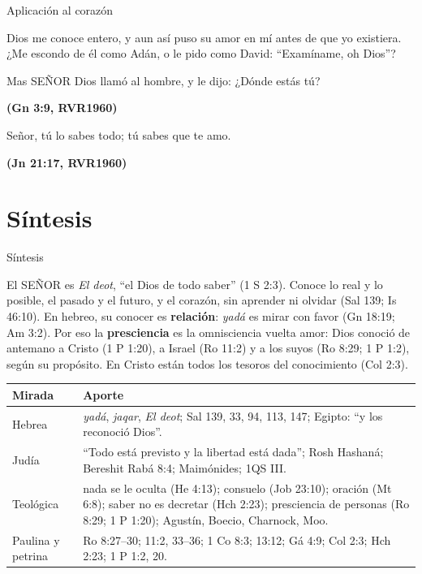 \documentclass[hyperref={bookmarks=false},aspectratio=169]{beamer}
\newcommand{\SENOR}{S{\fontsize{0.78em}{1em}\selectfont EÑOR}}
\newcommand{\fuente}[1]{\par\hfill{\upshape\bfseries\footnotesize\textcolor{azul}{#1}}}
\newcommand{\destacar}[1]{\textbf{\textcolor{azul}{#1}}}
\begin{document}
\begin{frame}{Aplicación al corazón}
\begin{tcolorbox}[colback=papiro,colframe=dorado,boxrule=1.4pt,arc=3pt]
\centering\large Dios me conoce entero, y aun así puso su amor en mí antes de que yo existiera. ¿Me escondo de él como Adán, o le pido como David: ``Examíname, oh Dios''?
\end{tcolorbox}\par\medskip
\begin{cita}Mas \SENOR{} Dios llamó al hombre, y le dijo: ¿Dónde estás tú?\fuente{(Gn 3:9, RVR1960)}\end{cita}
\begin{cita}Señor, tú lo sabes todo; tú sabes que te amo.\fuente{(Jn 21:17, RVR1960)}\end{cita}
\end{frame}

\section{Síntesis}

\begin{frame}{Síntesis}
\begin{tcolorbox}[colback=papiro,colframe=azul,boxrule=1pt,arc=3pt]
\small El \SENOR{} es \emph{El deot}, ``el Dios de todo saber'' (1 S 2:3). Conoce lo real y lo posible, el pasado y el futuro, y el corazón, sin aprender ni olvidar (Sal 139; Is 46:10). En hebreo, su conocer es \destacar{relación}: \emph{yadá} es mirar con favor (Gn 18:19; Am 3:2). Por eso la \destacar{presciencia} es la omnisciencia vuelta amor: Dios conoció de antemano a Cristo (1 P 1:20), a Israel (Ro 11:2) y a los suyos (Ro 8:29; 1 P 1:2), según su propósito. En Cristo están todos los tesoros del conocimiento (Col 2:3).
\end{tcolorbox}
\scriptsize\renewcommand{\arraystretch}{1.12}
\begin{tabular}{@{}>{\RaggedRight\arraybackslash}p{2.4cm}>{\RaggedRight\arraybackslash}p{9.4cm}@{}}
\toprule
\textbf{Mirada} & \textbf{Aporte} \\ \midrule
Hebrea & \emph{yadá}, \emph{jaqar}, \emph{El deot}; Sal 139, 33, 94, 113, 147; Egipto: ``y los reconoció Dios''. \\
Judía & ``Todo está previsto y la libertad está dada''; Rosh Hashaná; Bereshit Rabá 8:4; Maimónides; 1QS III. \\
Teológica & nada se le oculta (He 4:13); consuelo (Job 23:10); oración (Mt 6:8); saber no es decretar (Hch 2:23); presciencia de personas (Ro 8:29; 1 P 1:20); Agustín, Boecio, Charnock, Moo. \\
Paulina y petrina & Ro 8:27--30; 11:2, 33--36; 1 Co 8:3; 13:12; Gá 4:9; Col 2:3; Hch 2:23; 1 P 1:2, 20. \\
\bottomrule
\end{tabular}
\end{frame}
\end{document}
